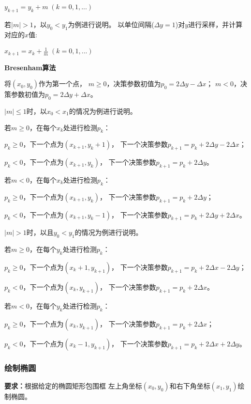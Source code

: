 \documentclass[a4paper,UTF8]{article}
\theoremstyle{definition}
\begin{document}
$y_{k+1}=y_k+m\;(k=0,1,...)$

若$|m|>1$，以$y_0<y_1$为例进行说明。
以单位间隔($\Delta y=1$)对$y$进行采样，并计算对应的$x$值:

$x_{k+1}=x_k+\frac{1}{m}\;(k=0,1,...)$

\textbf{Bresenham算法}

将$(x_0,y_0)$作为第一个点，
$m\geqslant 0$，决策参数初值为$p_0=2\Delta y-\Delta x$；
$m<0$，决策参数初值为$p_0=2\Delta y+\Delta x$。

$|m|\leqslant 1$时，以$x_0<x_1$的情况为例进行说明。

若$m\geqslant 0$，在每个$x_k$处进行检测$p_k$：

\hspace{2em}$p_k\geqslant 0$，下一个点为$(x_{k+1},y_{k}+1)$，
下一个决策参数$p_{k+1}=p_k+2\Delta y-2\Delta x$；

\hspace{2em}$p_k<0$，下一个点为$(x_{k+1},y_k)$，
下一个决策参数$p_{k+1}=p_k+2\Delta y$。

若$m<0$，在每个$x_k$处进行检测$p_k$：

\hspace{2em}$p_k\geqslant 0$，下一个点为$(x_{k+1},y_{k})$，
下一个决策参数$p_{k+1}=p_k+2\Delta y$；

\hspace{2em}$p_k<0$，下一个点为$(x_{k+1},y_{k}-1)$，
下一个决策参数$p_{k+1}=p_k+2\Delta y+2\Delta x$。


$|m|>1$时，以且$y_0<y_1$的情况为例进行说明。

若$m\geqslant 0$，在每个$y_k$处进行检测$p_k$：

\hspace{2em}$p_k\geqslant 0$，下一个点为$(x_{k}+1,y_{k+1})$，
下一个决策参数$p_{k+1}=p_k+2\Delta x-2\Delta y$；

\hspace{2em}$p_k<0$，下一个点为$(x_{k},y_{k+1})$，
下一个决策参数$p_{k+1}=p_k+2\Delta x$。

若$m<0$，在每个$y_k$处进行检测$p_k$：

\hspace{2em}$p_k\geqslant 0$，下一个点为$(x_{k},y_{k+1})$，
下一个决策参数$p_{k+1}=p_k+2\Delta x$；

\hspace{2em}$p_k<0$，下一个点为$(x_{k}-1,y_{k+1})$，
下一个决策参数$p_{k+1}=p_k+2\Delta x+2\Delta y$。


\subsubsection{绘制椭圆}
\textbf{要求：}根据给定的椭圆矩形包围框
左上角坐标$(x_0,y_0)$和右下角坐标$(x_1,y_1)$绘制椭圆。
\end{document}
